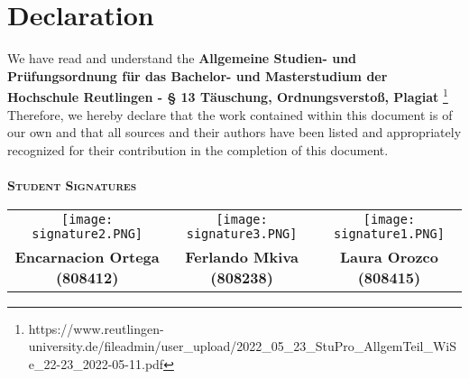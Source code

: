 

\section*{Declaration}
\noindent We have read and understand the \textbf{Allgemeine
Studien- und Prüfungsordnung für das Bachelor- und Masterstudium der Hochschule
Reutlingen - § 13 Täuschung, Ordnungsverstoß, Plagiat} \footnote{https://www.reutlingen-university.de/fileadmin/user\_upload/2022\_05\_23\_StuPro\_AllgemTeil\_WiSe\_22-23\_2022-05-11.pdf} ~\\

\noindent Therefore, we hereby declare that the work contained within this document is of our own and that all sources and their authors have been listed and appropriately recognized for their contribution in the completion of this document.~\\~\\

\noindent\textsc{\bfseries Student Signatures}\\[0.5 cm]

\begin{table}[!ht]
	\vspace{-10mm}
	\setlength\tabcolsep{15pt}
		\begin{tabulary}{\linewidth}{ccc}
			
			\texttt{[image: signature2.PNG]}&
			\texttt{[image: signature3.PNG]}&
			\texttt{[image: signature1.PNG]}\\
			
			\noindent \textbf{Encarnacion Ortega (808412)}&
			\noindent \textbf{Ferlando Mkiva (808238)}&
			\noindent \textbf{Laura Orozco (808415)}\\
			
		\end{tabulary}
\end{table}


\vfill





